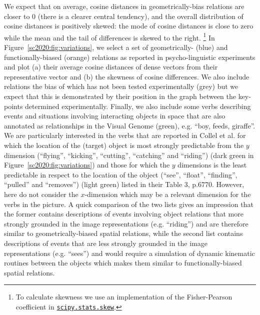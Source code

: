 We expect that on average, cosine distances in geometrically-bias relations are closer to 0 (there is a clearer central tendency), and the overall distribution of cosine distances is positively skewed: the mode of cosine distances is close to zero while the mean and the tail of differences is skewed to the right.%
\footnote{To calculate skewness we use an implementation of the Fisher-Pearson coefficient \cite[s.2.2.24.1]{kokoska2000crc} in \href{https://docs.scipy.org/doc/scipy/reference/generated/scipy.stats.skew.html}{\texttt{scipy.stats.skew}}.}
In Figure~\ref{sc2020:fig:variations}, 
we select a set of geometrically- (blue) and functionally-biased (orange) relations as reported in
psycho-linguistic experiments and plot (a) their average cosine distances of dense vectors from their representative vector and (b) the skewness of cosine differences. %
We also include relations the bias of which has not been tested experimentally (grey) but we expect that this is demonstrated by their position in the graph between the key-points determined experimentally. Finally, we
also
include some verbs describing events and situations involving interacting objects in space that are also annotated as relationships in the Visual Genome (green), e.g. ``boy, feeds, giraffe''. We are particularly interested in the verbs that are reported in Collel et al. \cite{collell2018acquiring} for which the location of the (target) object is most strongly predictable from the $y$ dimension (``flying'', ``kicking'', ``cutting'', ``catching'' and ``riding'') (dark green in Figure~\ref{sc2020:fig:variations}) and those for which the $y$ dimensions is the least predictable in respect to the location of the object (``see'', ``float'', ``finding'', ``pulled'' and ``removes'') (light green) listed in their Table 3, p.6770. However, here \cite{collell2018acquiring} do not consider the $x$-dimension which may be a relevant dimension for the verbs in the picture.
A quick comparison of the two lists gives an impression that the
former contains descriptions of events involving object relations that
more strongly grounded in the image representations (e.g. ``riding'')
and are therefore similar to geometrically-biased spatial relations,
while the second list contains descriptions of events that are less
strongly grounded in the image representations (e.g. ``sees'') and
would require a simulation of dynamic kinematic routines between the
objects which makes them similar to functionally-biased spatial
relations.

